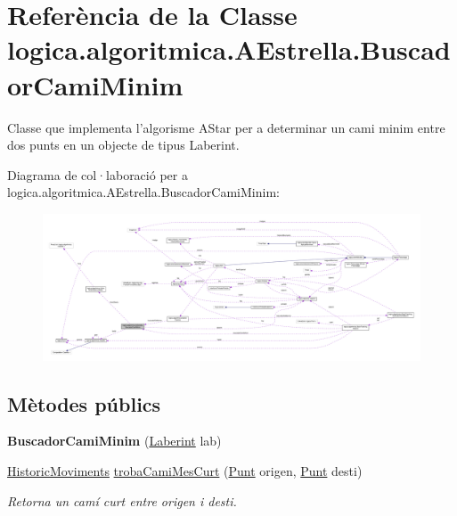 \hypertarget{classlogica_1_1algoritmica_1_1_a_estrella_1_1_buscador_cami_minim}{\section{Referència de la Classe logica.\+algoritmica.\+A\+Estrella.\+Buscador\+Cami\+Minim}
\label{classlogica_1_1algoritmica_1_1_a_estrella_1_1_buscador_cami_minim}
}


Classe que implementa l'algorisme A\+Star per a determinar un cami minim entre dos punts en un objecte de tipus Laberint.  




Diagrama de col·laboració per a logica.\+algoritmica.\+A\+Estrella.\+Buscador\+Cami\+Minim\+:
\nopagebreak
\begin{figure}[H]
\begin{center}
\leavevmode
\includegraphics[width=350pt]{classlogica_1_1algoritmica_1_1_a_estrella_1_1_buscador_cami_minim__coll__graph}
\end{center}
\end{figure}
\subsection*{Mètodes públics}
\begin{DoxyCompactItemize}
\item 
\hypertarget{classlogica_1_1algoritmica_1_1_a_estrella_1_1_buscador_cami_minim_aa83d350da116b2748bbd714081720017}{{\bfseries Buscador\+Cami\+Minim} (\hyperlink{classlogica_1_1laberints_1_1_laberint}{Laberint} lab)}\label{classlogica_1_1algoritmica_1_1_a_estrella_1_1_buscador_cami_minim_aa83d350da116b2748bbd714081720017}

\item 
\hyperlink{classlogica_1_1historic__moviments_1_1_historic_moviments}{Historic\+Moviments} \hyperlink{classlogica_1_1algoritmica_1_1_a_estrella_1_1_buscador_cami_minim_a31bce579bd1b302c4eaa16f981655454}{troba\+Cami\+Mes\+Curt} (\hyperlink{classlogica_1_1_punt}{Punt} origen, \hyperlink{classlogica_1_1_punt}{Punt} desti)
\begin{DoxyCompactList}\small\item\em Retorna un camí curt entre origen i desti. \end{DoxyCompactList}\end{DoxyCompactItemize}
